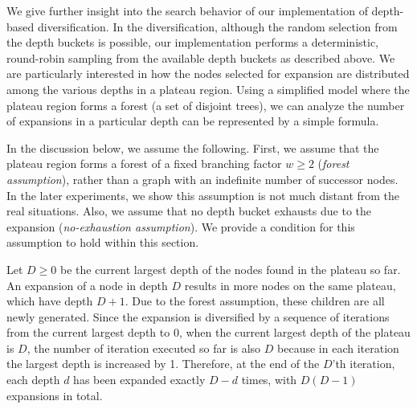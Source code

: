We give further insight into the search behavior of our implementation of depth-based diversification.
In the diversification, although the random selection from the depth buckets is possible,
our implementation performs a deterministic, round-robin sampling from the available depth buckets as described above.
% 
We are particularly interested in how the nodes selected for expansion are distributed 
among the various depths in a plateau region.
Using a simplified model where the plateau region forms a forest (a set of disjoint trees),
we can analyze the number of expansions in a particular depth
can be represented by a simple formula. 




% 
In the discussion below, we assume the following.
First, we assume that the plateau region forms a forest of a fixed branching factor
$w\geq 2$ (\emph{forest assumption}), rather than a graph with an indefinite number of successor nodes.
In the later experiments, we show this assumption is not much distant from the real situations.
Also, we assume that no depth bucket exhausts due to the expansion (\emph{no-exhaustion assumption}).
We provide a condition for this assumption to hold within this section.

Let $D\geq 0$ be the current largest depth of the nodes found in the plateau so far. An expansion of a node in
depth $D$ results in more nodes on the same plateau, which have depth $D+1$.  Due to the forest
assumption, these children are all newly generated. Since the expansion is
diversified by a sequence of iterations from the current largest depth to 0, when the current
largest depth of the plateau is $D$, the number of iteration executed so far is also $D$ because
in each iteration the largest depth is increased by 1.
Therefore, at the end of the $D$'th iteration, each depth $d$ has been expanded exactly $D-d$ times, with $D(D-1)$
expansions in total.

